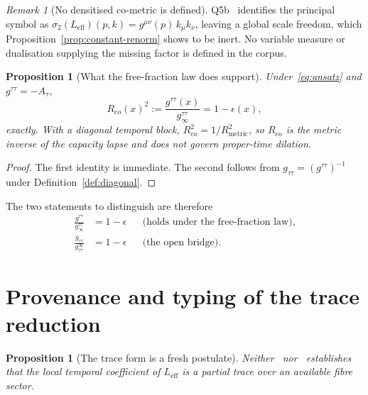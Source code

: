 \documentclass[12pt,a4paper]{article}
\newtheorem{proposition}[theorem]{Proposition}
\theoremstyle{remark}
\newtheorem{remark}[theorem]{Remark}
\theoremstyle{definition}
\begin{document}
    \begin{remark}[No densitised co-metric is defined]
      \label{rem:densitised}
      Q5b~\cite{Beau2026q5b} identifies the principal symbol as
      $\sigma_{2}(L_{\mathrm{eff}})(p,k)=g^{\mu\nu}(p)\,k_{\mu}k_{\nu}$, leaving a global scale
      freedom, which Proposition~\ref{prop:constant-renorm} shows to be inert.
      No variable measure or dualisation supplying the missing factor is defined in the corpus.
    \end{remark}

    \begin{proposition}[What the free-fraction law does support]
      \label{prop:co-ansatz}
      Under~\eqref{eq:ansatz} and $g^{\tau\tau}=-A_{\tau}$,
      \[
        R_{\mathrm{co}}(x)^{2}
        :=\frac{g^{\tau\tau}(x)}{g^{\tau\tau}_{\infty}}
        =1-\epsilon(x),
      \]
      exactly.
      With a diagonal temporal block, $R_{\mathrm{co}}^{2}=1/R_{\mathrm{metric}}^{2}$, so
      $R_{\mathrm{co}}$ is the metric inverse of the capacity lapse and does not govern proper-time
      dilation.
    \end{proposition}

    \begin{proof}
      The first identity is immediate.
      The second follows from $g_{\tau\tau}=(g^{\tau\tau})^{-1}$ under
      Definition~\ref{def:diagonal}.
    \end{proof}

    The two statements to distinguish are therefore
    \begin{align*}
      \frac{g^{\tau\tau}}{g^{\tau\tau}_{\infty}}&=1-\epsilon
        &&\text{(holds under the free-fraction law)},\\[2pt]
      \frac{g_{\tau\tau}}{g_{\tau\tau}^{\infty}}&=1-\epsilon
        &&\text{(the open bridge).}
    \end{align*}

  \section{Provenance and typing of the trace reduction}
    \label{sec:provenance}

    \begin{proposition}[The trace form is a fresh postulate]
      \label{prop:provenance}
      Neither~\cite{Beau2026w1} nor~\cite{Beau2026q11} establishes that the local temporal coefficient
      of $L_{\mathrm{eff}}$ is a partial trace over an available fibre sector.
    \end{proposition}
\end{document}
